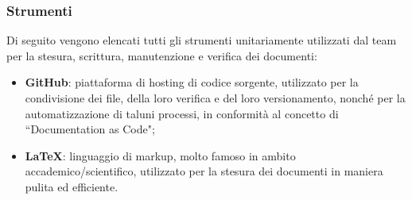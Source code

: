 \subsubsection{Strumenti}
Di seguito vengono elencati tutti gli strumenti unitariamente utilizzati dal team per la stesura, scrittura, manutenzione e verifica dei documenti:
\begin{itemize}
    \item \textbf{GitHub}: piattaforma di hosting di codice sorgente, utilizzato per la condivisione dei file, della loro verifica e del loro versionamento, nonché per la automatizzazione di taluni processi, in conformità al concetto di ``Documentation as Code";  
    \item \textbf{\LaTeX}: linguaggio di markup, molto famoso in ambito accademico/scientifico, utilizzato per la stesura dei documenti in maniera pulita ed efficiente.
\end{itemize}






